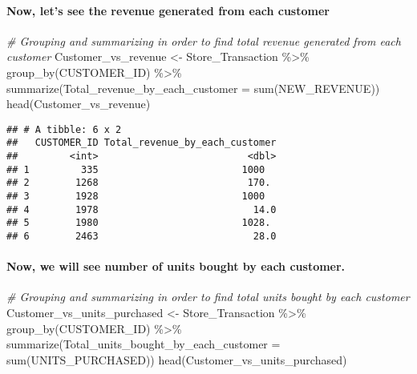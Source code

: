 \documentclass[
]{article}
\newenvironment{Shaded}{\begin{snugshade}}{\end{snugshade}}
\newcommand{\AttributeTok}[1]{\textcolor[rgb]{0.77,0.63,0.00}{#1}}
\newcommand{\CommentTok}[1]{\textcolor[rgb]{0.56,0.35,0.01}{\textit{#1}}}
\newcommand{\FunctionTok}[1]{\textcolor[rgb]{0.00,0.00,0.00}{#1}}
\newcommand{\NormalTok}[1]{#1}
\newcommand{\OtherTok}[1]{\textcolor[rgb]{0.56,0.35,0.01}{#1}}
\newcommand{\SpecialCharTok}[1]{\textcolor[rgb]{0.00,0.00,0.00}{#1}}
\begin{document}
\hypertarget{now-lets-see-the-revenue-generated-from-each-customer}{%
\paragraph{Now, let's see the revenue generated from each
customer}\label{now-lets-see-the-revenue-generated-from-each-customer}}

\begin{Shaded}
\begin{Highlighting}[]
\CommentTok{\# Grouping and summarizing in order to find total revenue generated from each customer}
\NormalTok{Customer\_vs\_revenue }\OtherTok{\textless{}{-}}\NormalTok{ Store\_Transaction }\SpecialCharTok{\%\textgreater{}\%} \FunctionTok{group\_by}\NormalTok{(CUSTOMER\_ID) }\SpecialCharTok{\%\textgreater{}\%}
  \FunctionTok{summarize}\NormalTok{(}\AttributeTok{Total\_revenue\_by\_each\_customer =} \FunctionTok{sum}\NormalTok{(NEW\_REVENUE))}
\FunctionTok{head}\NormalTok{(Customer\_vs\_revenue)}
\end{Highlighting}
\end{Shaded}

\begin{verbatim}
## # A tibble: 6 x 2
##   CUSTOMER_ID Total_revenue_by_each_customer
##         <int>                          <dbl>
## 1         335                         1000  
## 2        1268                          170. 
## 3        1928                         1000  
## 4        1978                           14.0
## 5        1980                         1028. 
## 6        2463                           28.0
\end{verbatim}

\hypertarget{now-we-will-see-number-of-units-bought-by-each-customer.}{%
\paragraph{Now, we will see number of units bought by each
customer.}\label{now-we-will-see-number-of-units-bought-by-each-customer.}}

\begin{Shaded}
\begin{Highlighting}[]
\CommentTok{\# Grouping and summarizing in order to find total units bought by each customer }
\NormalTok{Customer\_vs\_units\_purchased }\OtherTok{\textless{}{-}}\NormalTok{ Store\_Transaction }\SpecialCharTok{\%\textgreater{}\%} \FunctionTok{group\_by}\NormalTok{(CUSTOMER\_ID) }\SpecialCharTok{\%\textgreater{}\%}
  \FunctionTok{summarize}\NormalTok{(}\AttributeTok{Total\_units\_bought\_by\_each\_customer =} \FunctionTok{sum}\NormalTok{(UNITS\_PURCHASED))}
\FunctionTok{head}\NormalTok{(Customer\_vs\_units\_purchased)}
\end{Highlighting}
\end{Shaded}
\end{document}
